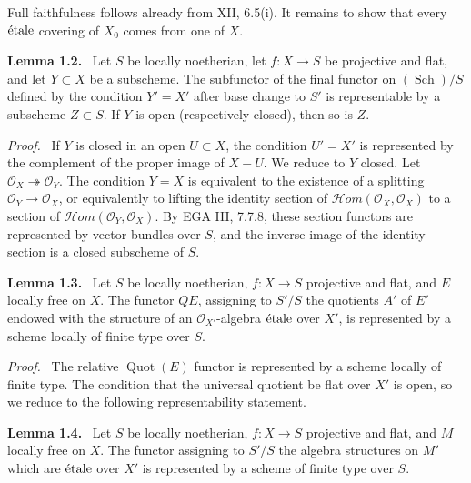 \documentclass[12pt]{article}
\newcommand{\Oo}{\mathcal{O}}
\newcommand{\Sch}{\operatorname{Sch}}
\newcommand{\etale}{\ifmmode\textnormal{\'etale}\else\'etale\fi}
\DeclareMathOperator{\Quot}{Quot}
\newcommand{\Hhom}{\mathcal{H}\!om}
\newenvironment{statement}[1]{\par\medskip\noindent\textbf{#1.}\ }{\par\medskip}
\newenvironment{prooftext}[1][Proof]{\par\noindent\emph{#1.}\ }{\par\medskip}
\begin{document}
Full faithfulness follows already from XII, 6.5(i). It remains to show that every \(\etale\) covering of \(X_0\) comes from one of \(X\).

\begin{statement}{Lemma 1.2}
Let \(S\) be locally noetherian, let \(f:X\to S\) be projective and flat, and let \(Y\subset X\) be a subscheme. The subfunctor of the final functor on \((\Sch)/S\) defined by the condition \(Y'=X'\) after base change to \(S'\) is representable by a subscheme \(Z\subset S\). If \(Y\) is open (respectively closed), then so is \(Z\).
\end{statement}

\begin{prooftext}
If \(Y\) is closed in an open \(U\subset X\), the condition \(U'=X'\) is represented by the complement of the proper image of \(X-U\). We reduce to \(Y\) closed. Let \(\Oo_X\twoheadrightarrow\Oo_Y\). The condition \(Y=X\) is equivalent to the existence of a splitting \(\Oo_Y\to\Oo_X\), or equivalently to lifting the identity section of \(\Hhom(\Oo_X,\Oo_X)\) to a section of \(\Hhom(\Oo_Y,\Oo_X)\). By EGA III, 7.7.8, these section functors are represented by vector bundles over \(S\), and the inverse image of the identity section is a closed subscheme of \(S\).
\end{prooftext}

\begin{statement}{Lemma 1.3}
Let \(S\) be locally noetherian, \(f:X\to S\) projective and flat, and \(E\) locally free on \(X\). The functor \(QE\), assigning to \(S'/S\) the quotients \(A'\) of \(E'\) endowed with the structure of an \(\Oo_{X'}\)-algebra \(\etale\) over \(X'\), is represented by a scheme locally of finite type over \(S\).
\end{statement}

\begin{prooftext}
The relative \(\Quot(E)\) functor is represented by a scheme locally of finite type. The condition that the universal quotient be flat over \(X'\) is open, so we reduce to the following representability statement.
\end{prooftext}

\begin{statement}{Lemma 1.4}
Let \(S\) be locally noetherian, \(f:X\to S\) projective and flat, and \(M\) locally free on \(X\). The functor assigning to \(S'/S\) the algebra structures on \(M'\) which are \(\etale\) over \(X'\) is represented by a scheme of finite type over \(S\).
\end{statement}
\end{document}
